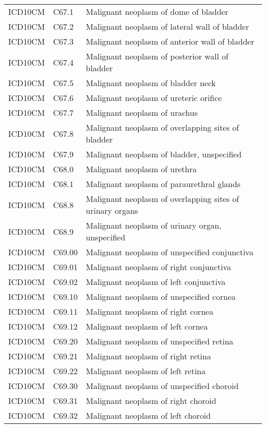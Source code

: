 \begin{longtable}{p{}p{}p{}}
  ICD10CM & C67.1 & Malignant neoplasm of dome of bladder \\ 
  ICD10CM & C67.2 & Malignant neoplasm of lateral wall of bladder \\ 
  ICD10CM & C67.3 & Malignant neoplasm of anterior wall of bladder \\ 
  ICD10CM & C67.4 & Malignant neoplasm of posterior wall of bladder \\ 
  ICD10CM & C67.5 & Malignant neoplasm of bladder neck \\ 
  ICD10CM & C67.6 & Malignant neoplasm of ureteric orifice \\ 
  ICD10CM & C67.7 & Malignant neoplasm of urachus \\ 
  ICD10CM & C67.8 & Malignant neoplasm of overlapping sites of bladder \\ 
  ICD10CM & C67.9 & Malignant neoplasm of bladder, unspecified \\ 
  ICD10CM & C68.0 & Malignant neoplasm of urethra \\ 
  ICD10CM & C68.1 & Malignant neoplasm of paraurethral glands \\ 
  ICD10CM & C68.8 & Malignant neoplasm of overlapping sites of urinary organs \\ 
  ICD10CM & C68.9 & Malignant neoplasm of urinary organ, unspecified \\ 
  ICD10CM & C69.00 & Malignant neoplasm of unspecified conjunctiva \\ 
  ICD10CM & C69.01 & Malignant neoplasm of right conjunctiva \\ 
  ICD10CM & C69.02 & Malignant neoplasm of left conjunctiva \\ 
  ICD10CM & C69.10 & Malignant neoplasm of unspecified cornea \\ 
  ICD10CM & C69.11 & Malignant neoplasm of right cornea \\ 
  ICD10CM & C69.12 & Malignant neoplasm of left cornea \\ 
  ICD10CM & C69.20 & Malignant neoplasm of unspecified retina \\ 
  ICD10CM & C69.21 & Malignant neoplasm of right retina \\ 
  ICD10CM & C69.22 & Malignant neoplasm of left retina \\ 
  ICD10CM & C69.30 & Malignant neoplasm of unspecified choroid \\ 
  ICD10CM & C69.31 & Malignant neoplasm of right choroid \\ 
  ICD10CM & C69.32 & Malignant neoplasm of left choroid \\ 

\end{longtable}
